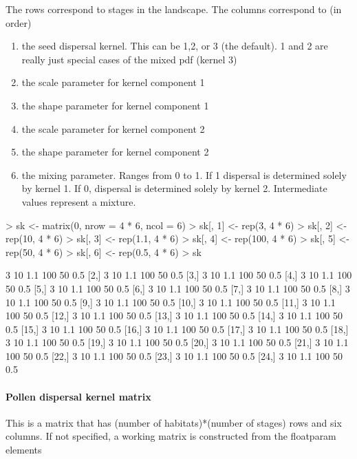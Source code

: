 \documentclass[10pt]{article}
\begin{document}
The rows correspond to stages in the landscape.  The columns correspond to (in order)
\begin{enumerate}
\item the seed dispersal kernel.  This can be 1,2, or 3 (the default).
  1 and 2 are really just special cases of the mixed pdf (kernel 3)
\item the scale parameter for kernel component 1
\item the shape parameter for kernel component 1
\item the scale parameter for kernel component 2
\item the shape parameter for kernel component 2
\item the mixing parameter.  Ranges from 0 to 1.  If 1 dispersal is
  determined solely by kernel 1.  If 0, dispersal is determined solely
  by kernel 2.  Intermediate values represent a mixture.
\end{enumerate}
\begin{Schunk}
\begin{Sinput}
> sk <- matrix(0, nrow = 4 * 6, ncol = 6)
> sk[, 1] <- rep(3, 4 * 6)
> sk[, 2] <- rep(10, 4 * 6)
> sk[, 3] <- rep(1.1, 4 * 6)
> sk[, 4] <- rep(100, 4 * 6)
> sk[, 5] <- rep(50, 4 * 6)
> sk[, 6] <- rep(0.5, 4 * 6)
> sk
\end{Sinput}
\begin{Soutput}
      [,1] [,2] [,3] [,4] [,5] [,6]
 [1,]    3   10  1.1  100   50  0.5
 [2,]    3   10  1.1  100   50  0.5
 [3,]    3   10  1.1  100   50  0.5
 [4,]    3   10  1.1  100   50  0.5
 [5,]    3   10  1.1  100   50  0.5
 [6,]    3   10  1.1  100   50  0.5
 [7,]    3   10  1.1  100   50  0.5
 [8,]    3   10  1.1  100   50  0.5
 [9,]    3   10  1.1  100   50  0.5
[10,]    3   10  1.1  100   50  0.5
[11,]    3   10  1.1  100   50  0.5
[12,]    3   10  1.1  100   50  0.5
[13,]    3   10  1.1  100   50  0.5
[14,]    3   10  1.1  100   50  0.5
[15,]    3   10  1.1  100   50  0.5
[16,]    3   10  1.1  100   50  0.5
[17,]    3   10  1.1  100   50  0.5
[18,]    3   10  1.1  100   50  0.5
[19,]    3   10  1.1  100   50  0.5
[20,]    3   10  1.1  100   50  0.5
[21,]    3   10  1.1  100   50  0.5
[22,]    3   10  1.1  100   50  0.5
[23,]    3   10  1.1  100   50  0.5
[24,]    3   10  1.1  100   50  0.5
\end{Soutput}
\end{Schunk}

\paragraph{Pollen dispersal kernel matrix}
This is a matrix that has (number of habitats)*(number of stages) rows
and six columns.  If not specified, a working matrix is constructed
from the floatparam elements
\end{document}
